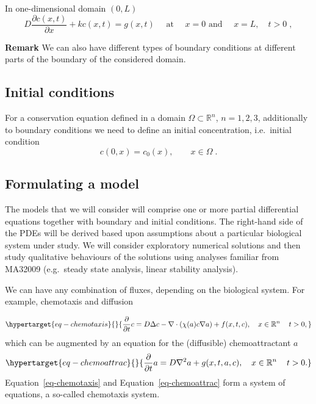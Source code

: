 \documentclass[
  letterpaper,
  DIV=11,
  numbers=noendperiod]{scrreprt}
\theoremstyle{plain}
\theoremstyle{definition}
\theoremstyle{plain}
\theoremstyle{remark}
\begin{document}
In one-dimensional domain \((0,L)\) \[
D \frac{\partial c(x,t)}{\partial x}  + k c(x,t) = g(x,t)  \quad \text{ at } \quad x=0  \text{ and } \quad x= L, \quad t >0 \; , 
\]

\textbf{Remark} We can also have different types of boundary conditions
at different parts of the boundary of the considered domain.

\hypertarget{initial-conditions}{%
\subsection{Initial conditions}\label{initial-conditions}}

For a conservation equation defined in a domain
\(\Omega \subset \mathbb R^n\), \(n=1,2,3\), additionally to boundary
conditions we need to define an initial concentration, i.e.~initial
condition \[
c(0,x) = c_0(x) , \qquad x \in \Omega  \; . 
\]

\hypertarget{formulating-a-model}{%
\subsection{Formulating a model}\label{formulating-a-model}}

The models that we will consider will comprise one or more partial
differential equations together with boundary and initial conditions.
The right-hand side of the PDEs will be derived based upon assumptions
about a particular biological system under study. We will consider
exploratory numerical solutions and then study qualitative behaviours of
the solutions using analyses familiar from MA32009 (e.g.~steady state
analysis, linear stability analysis).

We can have any combination of fluxes, depending on the biological
system. For example, chemotaxis and diffusion

\begin{equation}\protect\hypertarget{eq-chemotaxis}{}{
\frac{\partial}{\partial t} c = D \Delta c -\nabla \cdot (\chi(a) c \nabla a )  + f(x,t ,c),
\quad x\in \mathbb R^n \,  \quad t >0, 
}\label{eq-chemotaxis}\end{equation} which can be augmented by an
equation for the (diffusible) chemoattractant \(a\)
\begin{equation}\protect\hypertarget{eq-chemoattrac}{}{
\frac{\partial}{\partial t} a = D \nabla^2 a + g(x,t ,a, c),
\quad x\in \mathbb R^n \,  \quad t >0. 
}\label{eq-chemoattrac}\end{equation} Equation~\ref{eq-chemotaxis} and
Equation~\ref{eq-chemoattrac} form a system of equations, a so-called
chemotaxis system.
\end{document}
